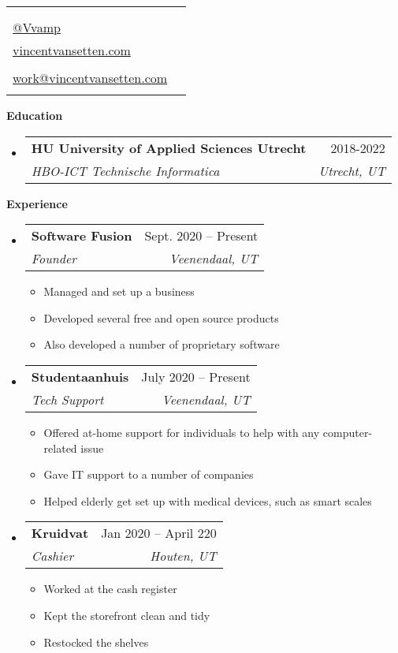 \documentclass[letterpaper,12pt]{article}[leftmargin=*]
\makeatletter
\def \fullname {Vincent van Setten}
\def \subtitle {}
\def \linkedinicon {\faLinkedin}
\def \linkedinlink {https://www.linkedin.com/in/vincentvansetten/}
\def \linkedintext {@vincentvansetten}
\def \phoneicon {\faPhone}
\def \phonetext {+31 6 449 453 78}
\def \emailicon {\faEnvelope}
\def \emaillink {mailto:work@vincentvansetten.com}
\def \emailtext {work@vincentvansetten.com}
\def \githubicon {\faGithub}
\def \githublink {https://github.com/Vvamp}
\def \githubtext {@Vvamp}
\def \websiteicon {\faGlobe}
\def \websitelink {https://vincentvansetten.com}
\def \websitetext {vincentvansetten.com}
\def \headertype {\singlecol} %
\def \entryspacing {-0pt}
\def \linkedin {\linkedinicon \hspace{3pt}\href{\linkedinlink}{\linkedintext}}
\def \phone {\phoneicon \hspace{3pt}{ \phonetext}}
\def \email {\emailicon \hspace{3pt}\href{\emaillink}{\emailtext}}
\def \github {\githubicon \hspace{3pt}\href{\githublink}{\githubtext}}
\def \website {\websiteicon \hspace{3pt}\href{\websitelink}{\websitetext}}
\renewcommand{\section}[2]{\vspace{5pt}
  \colorbox{secondary}{\color{white}\raggedbottom\normalsize\textbf{{#1}{\hspace{7pt}#2}}}
}
\newcommand{\resumeEntryStart}{\begin{itemize}[leftmargin=2.5mm]}
\newcommand{\resumeEntryEnd}{\end{itemize}\vspace{\entryspacing}}
\newcommand{\resumeItemListStart}{\begin{itemize}[leftmargin=4.5mm]}
\newcommand{\resumeItemListEnd}{\end{itemize}}
\newcommand{\resumeItem}[1]{
  \item\small{
    {#1 \vspace{-2pt}}
  }
}
\newcommand{\resumeEntryTSDL}[4]{
  \vspace{-1pt}\item[]
    \begin{tabularx}{0.97\textwidth}{X@{\hspace{60pt}}r}
      \textbf{\color{primary}#1} & {\firabook\color{accent}\small#2} \\
      \textit{\color{accent}\small#3} & \textit{\color{accent}\small#4} \\
    \end{tabularx}\vspace{-6pt}
}
\newcommand{\doublecol}[6]{
  \begin{tabularx}{\textwidth}{Xr}
    {
      \begin{tabular}[c]{l}
        \fontsize{35}{45}\selectfont{\color{primary}{{\textbf{\fullname}}}} \\
        {\textit{\subtitle}} %
      \end{tabular}
    } & {
      \begin{tabular}[c]{l@{\hspace{1.5em}}l}
        {\small#4} & {\small#1} \\
        {\small#5} & {\small#2} \\
        {\small#6} & {\small#3}
      \end{tabular}
    }
  \end{tabularx}
}
\newcommand{\singlecol}[6]{
  \begin{tabularx}{\textwidth}{Xr}
    {
      \begin{tabular}[b]{l}
        \fontsize{35}{45}\selectfont{\color{primary}{{\textbf{\fullname}}}} \\
        {\textit{\subtitle}} %
      \end{tabular}
    } & {
      \begin{tabular}[c]{l}
        {\small#1} \\
        {\small#2} \\
        {\small#3} \\
        {\small#4} \\
        {\small#5} \\
        {\small#6}
      \end{tabular}
    }
  \end{tabularx}
}
\makeatother
\begin{document}


\headertype{\linkedin}{\github}{\website}{\phone}{\email}{} %
\vspace{-10pt} %

\section{\faGraduationCap}{Education}

  \resumeEntryStart
    \resumeEntryTSDL
      {HU University of Applied Sciences Utrecht}{2018-2022}
      {HBO-ICT Technische Informatica}{Utrecht, UT}
  \resumeEntryEnd

\section{\faPieChart}{Experience}

  \resumeEntryStart
    \resumeEntryTSDL
      {Software Fusion}{Sept. 2020 -- Present}
      {Founder}{Veenendaal, UT}
    \resumeItemListStart
      \resumeItem {Managed and set up a business}
      \resumeItem {Developed several free and open source products}
      \resumeItem {Also developed a number of proprietary software}
    \resumeItemListEnd
  \resumeEntryEnd
  
   \resumeEntryStart
    \resumeEntryTSDL
      {Studentaanhuis}{July 2020 -- Present}
      {Tech Support}{Veenendaal, UT}
    \resumeItemListStart
      \resumeItem {Offered at-home support for individuals to help with any computer-related issue}
      \resumeItem {Gave IT support to a number of companies }
      \resumeItem {Helped elderly get set up with medical devices, such as smart scales}
    \resumeItemListEnd
  \resumeEntryEnd
  
   \resumeEntryStart
    \resumeEntryTSDL
      {Kruidvat}{Jan 2020 -- April 220}
      {Cashier}{Houten, UT}
    \resumeItemListStart
      \resumeItem {Worked at the cash register }
      \resumeItem {Kept the storefront clean and tidy}
      \resumeItem {Restocked the shelves}
    \resumeItemListEnd
  \resumeEntryEnd
\end{document}
